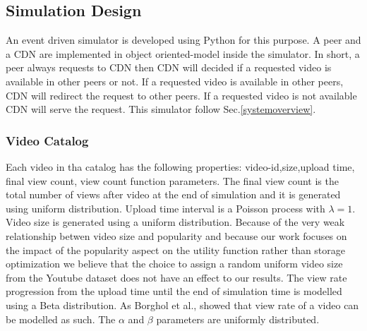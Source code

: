 \documentclass[10pt,final,journal,a4paper]{IEEEtran}
\begin{document}
\subsection{Simulation Design}\label{simulationdesign}
An event driven simulator is developed using Python for this purpose.
A peer and a CDN are implemented in object oriented-model inside the simulator. 
In short, a peer always requests to CDN then CDN will decided if a requested video is available in other peers or not. 
If a requested video is available in other peers, CDN will redirect the request to other peers.
If a requested video is not available CDN will serve the request.
This simulator follow Sec.\ref{systemoverview}.


\subsubsection{Video Catalog}\label{catalog}
Each video in tha catalog has the following properties: 
video-id,size,upload time, final view count, view count function parameters. 
The final view count is the total number of views after video at the end of simulation and it is generated using uniform distribution.
Upload time interval is a Poisson process with $\lambda=1$.
Video size is generated using a uniform distribution.
Because of the very weak relationship betwen video size and popularity \cite{abhari2010workload} and because our work focuses on the impact of the popularity aspect on the utility function rather than storage optimization we believe that the choice to assign a random uniform video size from the Youtube dataset does not have an effect to our results. 
The view rate progression from the upload time until the end of simulation time is modelled using a Beta distribution.
As Borghol et al.,\cite{Borghol:2011:CMP:2039452.2039717} showed that view rate of a video can be modelled as such. 
The $\alpha$ and $\beta$ parameters are uniformly distributed. 
\end{document}
